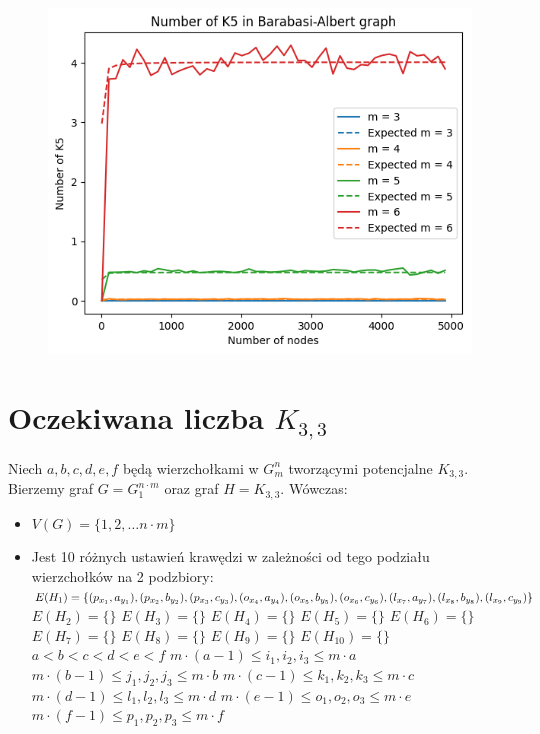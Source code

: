 \documentclass{article}
\begin{document}
\begin{figure}[h!]
  \centering
  \includegraphics[width=13cm]{../k5.png}
\end{figure}

\newpage

\section{Oczekiwana liczba $K_{3,3}$}
Niech $a,b,c,d,e,f$ będą wierzchołkami w $G_m^n$ tworzącymi potencjalne $K_{3,3}$. Bierzemy graf $G=G^{n \cdot m}_1$ oraz graf $H = K_{3,3}$. Wówczas:
\begin{itemize}
  \item $V(G) = \{ 1,2,\ldots n \cdot m \}$
  \item Jest 10 różnych ustawień krawędzi w zależności od tego podziału wierzchołków na 2 podzbiory:
    \subitem $E(H_1) = \{(p_{x_1},a_{y_1}), (p_{x_2},b_{y_2}), (p_{x_3},c_{y_3}), (o_{x_4},a_{y_4}), (o_{x_5},b_{y_5}), (o_{x_6},c_{y_6}), \newline (l_{x_7},a_{y_7}), (l_{x_8},b_{y_8}), (l_{x_9},c_{y_9}) \}$
    \subitem $E(H_2) = \{ \}$
    \subitem $E(H_3) = \{ \}$
    \subitem $E(H_4) = \{ \}$
    \subitem $E(H_5) = \{ \}$
    \subitem $E(H_6) = \{ \}$
    \subitem $E(H_7) = \{ \}$
    \subitem $E(H_8) = \{ \}$
    \subitem $E(H_9) = \{ \}$
    \subitem $E(H_{10}) = \{ \}$
    \newline
    \subitem $a < b < c < d < e < f$
    \subitem $m \cdot (a-1) \leq i_1,i_2,i_3 \leq m \cdot a$
    \subitem $m \cdot (b-1) \leq j_1,j_2,j_3 \leq m \cdot b$
    \subitem $m \cdot (c-1) \leq k_1,k_2,k_3 \leq m \cdot c$
    \subitem $m \cdot (d-1) \leq l_1,l_2,l_3 \leq m \cdot d$
    \subitem $m \cdot (e-1) \leq o_1,o_2,o_3 \leq m \cdot e$
    \subitem $m \cdot (f-1) \leq p_1,p_2,p_3 \leq m \cdot f$
\end{itemize}
\end{document}

